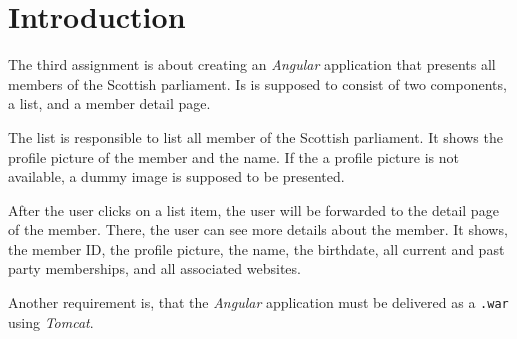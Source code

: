 \section{Introduction}\label{sec:01_intro}
The third assignment is about creating an \textit{Angular} application that presents all members of the Scottish parliament.
Is is supposed to consist of two components, a list, and a member detail page.

The list is responsible to list all member of the Scottish parliament. It shows the profile picture of the member and the name. If the a profile picture is not available, a dummy image is supposed to be presented.

After the user clicks on a list item, the user will be forwarded to the detail page of the member. There, the user can see more details about the member. It shows, the member ID, the profile picture, the name, the birthdate, all current and past party memberships, and all associated websites.


Another requirement is, that the \textit{Angular} application must be delivered as a \texttt{.war} using \textit{Tomcat}.

